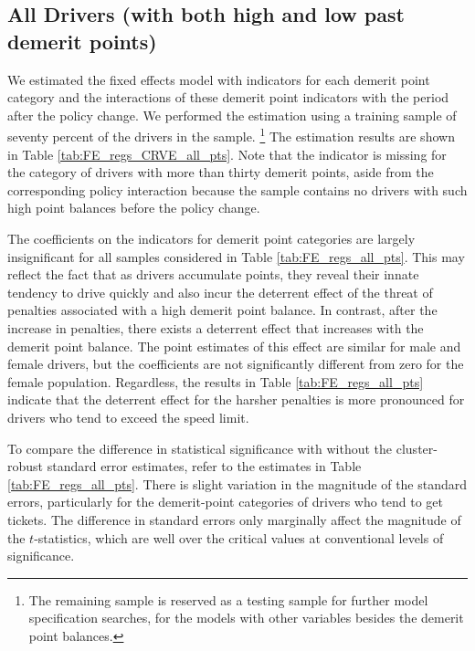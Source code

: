 \documentclass[12pt]{paper}
\begin{document}
\subsection*{All Drivers (with both high and low past demerit points)}

We estimated the fixed effects model with indicators for each demerit point category
and the interactions of these demerit point indicators with the period after the policy change. 
We performed the estimation using a training sample of seventy percent of the drivers in the sample.%
\footnote{The remaining sample is reserved as a testing sample for further model specification searches, for the models with other variables besides the demerit point balances. }
The estimation results are shown in Table \ref{tab:FE_regs_CRVE_all_pts}. 
% 
Note that the indicator is missing for the category of drivers with more than thirty demerit points, 
aside from the corresponding policy interaction because the sample contains no drivers with such high point balances before the policy change. 
% 



The coefficients on the indicators for demerit point categories are largely insignificant for all samples considered in Table \ref{tab:FE_regs_all_pts}. 
This may reflect the fact that as drivers accumulate points, they reveal their innate tendency to drive quickly and also incur the deterrent effect of the threat of penalties associated with a high demerit point balance. 
In contrast, after the increase in penalties, there exists a deterrent effect that increases with the demerit point balance. 
The point estimates of this effect are similar for male and female drivers, 
but the coefficients are not significantly different from zero for the female population. 
Regardless, the results in Table \ref{tab:FE_regs_all_pts} indicate that the deterrent effect
for the harsher penalties is more pronounced for drivers who tend to exceed the speed limit. 


To compare the difference in statistical significance with without the cluster-robust standard error estimates, 
refer to the estimates in Table \ref{tab:FE_regs_all_pts}. 
There is slight variation in the magnitude of the standard errors, 
particularly for the demerit-point categories of drivers who tend to get tickets. 
The difference in standard errors only marginally affect the magnitude of the $t$-statistics, 
which are well over the critical values at conventional levels of significance. 
\end{document}
